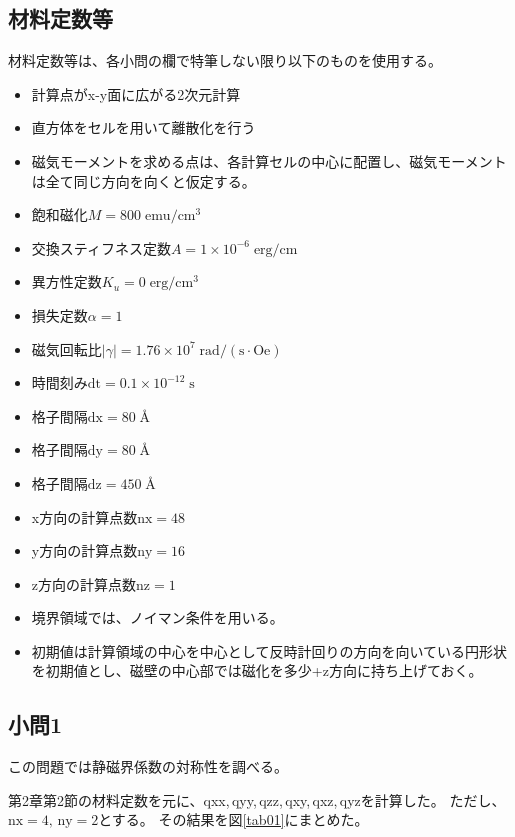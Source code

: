 \documentclass{jsarticle}
\begin{document}
\subsection{材料定数等}
材料定数等は、各小問の欄で特筆しない限り以下のものを使用する。
\begin{itemize}
	\item 計算点がx-y面に広がる2次元計算
	\item 直方体をセルを用いて離散化を行う
	\item 磁気モーメントを求める点は、各計算セルの中心に配置し、磁気モーメントは全て同じ方向を向くと仮定する。
	\item 飽和磁化$M = 800\;\mathrm{emu/cm^3}$
	\item 交換スティフネス定数$A = 1\times 10^{-6}\;\mathrm{erg/cm}$
	\item 異方性定数$K_u = 0\;\mathrm{erg/cm^3}$
	\item 損失定数$\alpha = 1$
	\item 磁気回転比$\lvert\gamma\rvert = 1.76\times 10^7\;\mathrm{rad/(s\cdot Oe)}$
	\item 時間刻み$\mathrm{dt} = 0.1\times 10^{-12}\;\mathrm{s}$
	\item 格子間隔$\mathrm{dx} = 80\;$\AA
	\item 格子間隔$\mathrm{dy} = 80\;$\AA
	\item 格子間隔$\mathrm{dz} = 450\;$\AA
	\item x方向の計算点数$\mathrm{nx} = 48$
	\item y方向の計算点数$\mathrm{ny} = 16$
	\item z方向の計算点数$\mathrm{nz} = 1$
	\item 境界領域では、ノイマン条件を用いる。
	\item 初期値は計算領域の中心を中心として反時計回りの方向を向いている円形状を初期値とし、磁壁の中心部では磁化を多少+z方向に持ち上げておく。
\end{itemize}

\subsection{小問1}
この問題では静磁界係数の対称性を調べる。

第2章第2節の材料定数を元に、qxx,\,qyy,\,qzz,\,qxy,\,qxz,\,qyzを計算した。
ただし、$\mathrm{nx} = 4,\,\mathrm{ny} = 2$とする。
その結果を図\ref{tab01}にまとめた。
\end{document}
